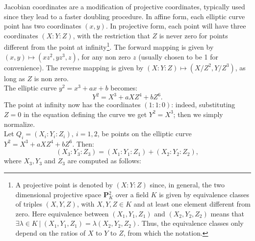 \bigskip
\noindent
Jacobian coordinates are a modification of projective coordinates, typically used since they lead to a faster doubling procedure. In affine form, each elliptic curve point has two coordinates $(x, y)$. In projective form, each point will have three coordinates $(X : Y : Z)$, with the restriction that $Z$ is never zero for points different from the point at infinity\footnote{A projective point is denoted by $(X : Y : Z)$ since, in general, the two dimensional projective space \textbf{P}$_K^2$ over a field $K$ is given by equivalence classes of triples $(X, Y, Z)$, with $X, Y, Z \in K$ and at least one element different from zero. Here equivalence between $(X_1, Y_1, Z_1)$ and $(X_2, Y_2, Z_2)$ means that $\exists \lambda \in K \ | \ (X_1, Y_1, Z_1) = \lambda(X_2, Y_2, Z_2)$. Thus, the equivalence classes only depend on the ratios of $X$ to $Y$ to $Z$, from which the notation.}. The forward mapping is given by $(x, y) \mapsto (xz^2, yz^3, z)$, for any non zero $z$ (usually chosen to be 1 for convenience). The reverse mapping is given by $(X : Y : Z) \mapsto (X/Z^2, Y/Z^3)$, as long as $Z$ is non zero.
\\
The elliptic curve $y^2 = x^3 + ax + b$ becomes:
$$Y^2 = X^3 + aXZ^4 + bZ^6.$$
The point at infinity now has the coordinates $(1 : 1 : 0)$: indeed, substituting $Z = 0$ in the equation defining the curve we get $Y^2 = X^3$; then we simply normalize.
\\
Let $Q_i = (X_i : Y_i : Z_i), \ i = 1, 2$, be points on the elliptic curve $Y^2 = X^3 + aXZ^4 + bZ^6$. Then:
$$(X_3 : Y_3 : Z_3) = (X_1 : Y_1 : Z_1) + (X_2 : Y_2 : Z_2),$$
where $X_3,Y_3$ and $Z_3$ are computed as follows:
